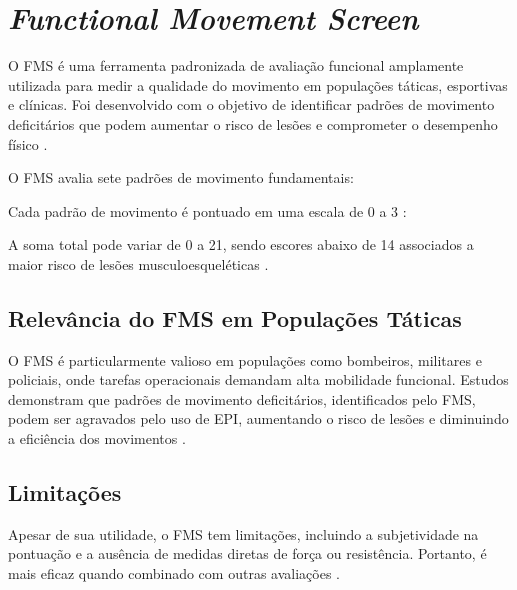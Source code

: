 \chapter{\textit{Functional Movement Screen}}

O \acrfull{FMS} é uma ferramenta padronizada de avaliação funcional amplamente utilizada para medir a qualidade do movimento
 em populações táticas, esportivas e clínicas. Foi desenvolvido com o objetivo de identificar padrões de movimento deficitários que podem aumentar
  o risco de lesões e comprometer o desempenho físico \cite{cook2006pre}.

\tab O \acrshort{FMS} avalia sete padrões de movimento fundamentais:


	\begin{centering}
	\end{centering}

\tab Cada padrão de movimento é pontuado em uma escala de 0 a 3 \cite{cook2006pre, teyhen2012functional}: 

\tab A soma total pode variar de 0 a 21, sendo escores abaixo de 14 associados a maior risco de lesões musculoesqueléticas \cite{bock2015use}.

\section{Relevância do \acrshort{FMS} em Populações Táticas}
O \acrshort{FMS} é particularmente valioso em populações como bombeiros, militares e policiais, onde tarefas operacionais demandam alta mobilidade funcional.
 Estudos demonstram que padrões de movimento deficitários, identificados pelo \acrshort{FMS}, podem ser agravados pelo uso de \acrshort{EPI}, aumentando o risco
  de lesões e diminuindo a eficiência dos movimentos \cite{orr2019impact}. 

\section{Limitações}
Apesar de sua utilidade, o \acrshort{FMS} tem limitações, incluindo a subjetividade na pontuação e a ausência de medidas diretas de força ou resistência.
 Portanto, é mais eficaz quando combinado com outras avaliações \cite{gribble2013intrarater}.